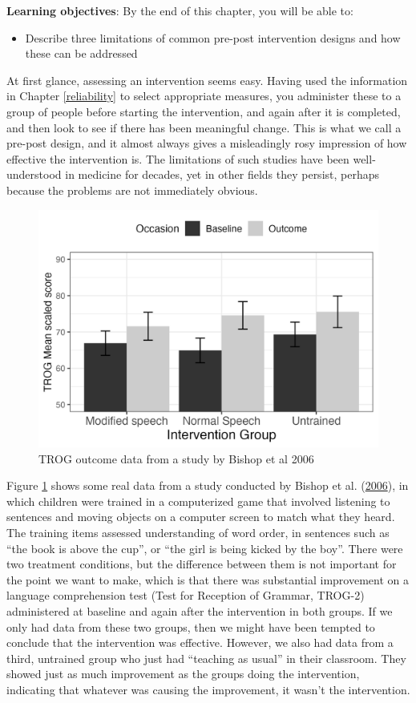 \documentclass{krantz}
\providecommand{\tightlist}{%
\setlength{\itemsep}{0pt}\setlength{\parskip}{0pt}}
\begin{document}
\textbf{Learning objectives}: By the end of this chapter, you will be able to:

\begin{itemize}
\tightlist
\item
  Describe three limitations of common pre-post intervention designs and how these can be addressed
\end{itemize}

At first glance, assessing an intervention seems easy. Having used the information in Chapter \ref{reliability} to select appropriate measures, you administer these to a group of people before starting the intervention, and again after it is completed, and then look to see if there has been meaningful change. This is what we call a pre-post design, and it almost always gives a misleadingly rosy impression of how effective the intervention is. The limitations of such studies have been well-understood in medicine for decades, yet in other fields they persist, perhaps because the problems are not immediately obvious.

\begin{figure}
\includegraphics[width=0.75\linewidth]{images_bw/trogchangefig} \caption{TROG outcome data from a study by Bishop et al 2006}\label{fig:trogfig}
\end{figure}

Figure \ref{fig:trogfig} shows some real data from a study conducted by Bishop et al. (\protect\hyperlink{ref-bishop2006}{2006}), in which children were trained in a computerized game that involved listening to sentences and moving objects on a computer screen to match what they heard. The training items assessed understanding of word order, in sentences such as ``the book is above the cup'', or ``the girl is being kicked by the boy''. There were two treatment conditions, but the difference between them is not important for the point we want to make, which is that there was substantial improvement on a language comprehension test (Test for Reception of Grammar, TROG-2) administered at baseline and again after the intervention in both groups. If we only had data from these two groups, then we might have been tempted to conclude that the intervention was effective. However, we also had data from a third, untrained group who just had ``teaching as usual'' in their classroom. They showed just as much improvement as the groups doing the intervention, indicating that whatever was causing the improvement, it wasn't the intervention.
\end{document}
